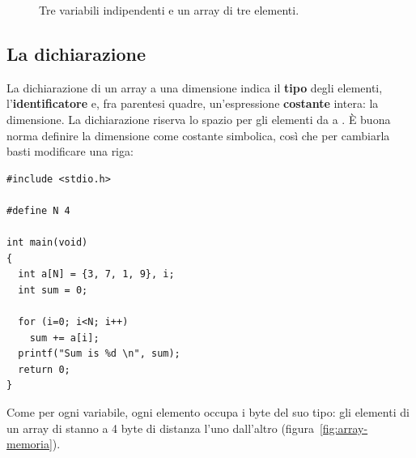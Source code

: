 \begin{figure}[H]
  \centering
  \caption{Tre variabili indipendenti e un array di tre elementi.}
  \label{fig:tre-variabili}
\end{figure}

\subsection{La dichiarazione}

La dichiarazione di un array a una dimensione indica il \textbf{tipo} degli
elementi, l'\textbf{identificatore} e, fra parentesi quadre, un'espressione
\textbf{costante} intera: la dimensione. La dichiarazione
 riserva lo spazio per gli elementi da  a
. È buona norma definire la dimensione come costante
simbolica, così che per cambiarla basti modificare una riga:

\begin{affianco}[0.5][c]
\begin{lstlisting}[style=c, name=somma.c]
#include <stdio.h>

#define N 4

int main(void)
{
  int a[N] = {3, 7, 1, 9}, i;
  int sum = 0;

  for (i=0; i<N; i++)
    sum += a[i];
  printf("Sum is %d \n", sum);
  return 0;
}
\end{lstlisting}
\risultato
{}
\vspace{2pt}
\end{affianco}

Come per ogni variabile, ogni elemento occupa i byte del suo tipo: gli
elementi di un array di  stanno a 4 byte di distanza l'uno
dall'altro (figura~\ref{fig:array-memoria}).

